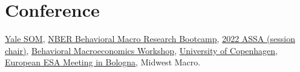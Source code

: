 
\section{Conference} %
\label{sec:conference}
\vspace{-0.25in}
\begin{outerlist}
	\item 	\href{https://som.yale.edu/event/2020/05/whitebox-advisors-graduate-student-conference-2020}{Yale SOM},  \href{https://www.nber.org/callforpapers/callpapersbehavioralmacro_bootcamp.html}{NBER Behavioral Macro Research Bootcamp}, \href{https://www.aeaweb.org/conference/2022/preliminary/1271?q=eNqrVipOLS7OzM8LqSxIVbKqhnGVrJQMlWp1lBKLi_OTgRwlHaWS1KJcXAgrJbESKpSZmwphlWWmloO0FxUUXDAFTA1AegsS00GyRkq1XDBuoh4V}{2022 ASSA (session chair)}, \href{https://behavioralmacro-workshop.com}{Behavioral Macroeconomics Workshop}, \href{https://www.economics.ku.dk/Calendar/workshopskonferencer/health-economics-workshop/}{University of Copenhagen}, \href{https://www.esabologna2022.com}{European ESA Meeting in Bologna}, Midwest Macro. 
\end{outerlist}

